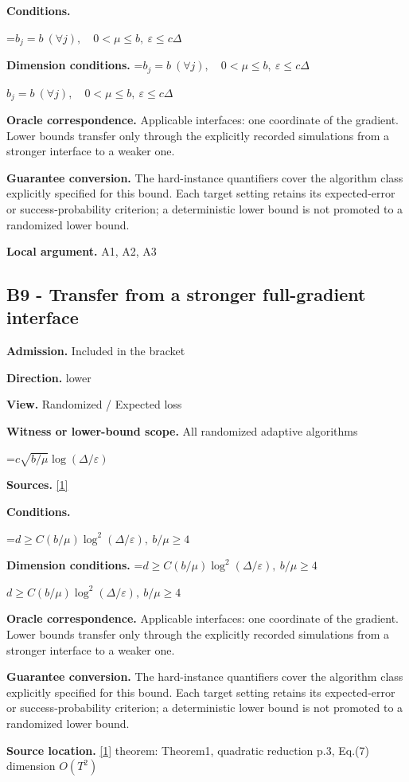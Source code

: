 \documentclass[10pt,a4paper]{article}
\newcommand{\AtlasMath}[1]{\par\begingroup\centering\setbox0=\hbox{$\displaystyle #1$}\ifdim\wd0>1.4\linewidth\typeout{ATLAS WIDE FORMULA: \the\wd0}\fi\ifdim\wd0>\linewidth\resizebox{\linewidth}{!}{\box0}\else\box0\fi\par\endgroup}
\newcommand{\AtlasInlineMath}[1]{\begingroup\setbox0=\hbox{$#1$}\ifdim\wd0>.4\linewidth\endgroup\AtlasMath{#1}\else\endgroup$#1$\fi}
\begin{document}
\textbf{Conditions.} 
\AtlasMath{b_j=b\ (\forall j),\quad0<\mu\le b,\ \varepsilon\le c\Delta}


\textbf{Dimension conditions.} \AtlasInlineMath{b_j=b\ (\forall j),\quad0<\mu\le b,\ \varepsilon\le c\Delta}

\textbf{Oracle correspondence.} Applicable interfaces: one coordinate of the gradient. Lower bounds transfer only through the explicitly recorded simulations from a stronger interface to a weaker one.

\textbf{Guarantee conversion.} The hard-instance quantifiers cover the algorithm class explicitly specified for this bound. Each target setting retains its expected-error or success-probability criterion; a deterministic lower bound is not promoted to a randomized lower bound.

\textbf{Local argument.} A1, A2, A3

\subsection{B9 - Transfer from a stronger full-gradient interface}
\textbf{Admission.} Included in the bracket

\textbf{Direction.} lower

\textbf{View.} Randomized / Expected loss

\textbf{Witness or lower-bound scope.} All randomized adaptive algorithms

\AtlasMath{c\sqrt{b/\mu}\log(\Delta/\varepsilon)}
\textbf{Sources.} \href{https://arxiv.org/pdf/2609.10874}{[1]}

\textbf{Conditions.} 
\AtlasMath{d\ge C(b/\mu)\log^2(\Delta/\varepsilon),\ b/\mu\ge4}


\textbf{Dimension conditions.} \AtlasInlineMath{d\ge C(b/\mu)\log^2(\Delta/\varepsilon),\ b/\mu\ge4}

\textbf{Oracle correspondence.} Applicable interfaces: one coordinate of the gradient. Lower bounds transfer only through the explicitly recorded simulations from a stronger interface to a weaker one.

\textbf{Guarantee conversion.} The hard-instance quantifiers cover the algorithm class explicitly specified for this bound. Each target setting retains its expected-error or success-probability criterion; a deterministic lower bound is not promoted to a randomized lower bound.

\textbf{Source location.} \href{https://arxiv.org/pdf/2609.10874}{[1]} theorem: Theorem1, quadratic reduction p.3, Eq.(7) dimension $O(T^2)$
\end{document}
